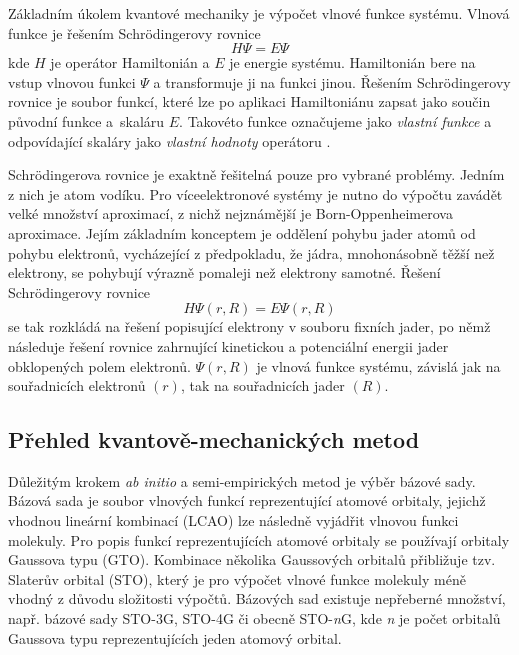 Základním úkolem kvantové mechaniky je výpočet vlnové funkce systému.
Vlnová funkce je řešením Schrödingerovy rovnice $$ H\Psi = E\Psi$$ kde $H$ je operátor Hamiltonián a $E$
 je energie systému. Hamiltonián bere na vstup vlnovou funkci $\Psi$ a transformuje ji na funkci jinou. Řešením Schrödingerovy rovnice je soubor funkcí, které lze po aplikaci Hamiltoniánu zapsat jako součin původní funkce a~skaláru $E$. Takovéto funkce označujeme jako \textit{vlastní funkce} a odpovídající skaláry jako \textit{vlastní hodnoty} operátoru \cite{Volatron}. 
 
 Schrödingerova rovnice je exaktně řešitelná pouze pro vybrané problémy. Jedním z nich je atom vodíku. Pro víceelektronové systémy je nutno do výpočtu zavádět velké množství aproximací, z nichž nejznámější je Born-Oppenheimerova aproximace. %
 Jejím základním konceptem je oddělení pohybu jader atomů od pohybu elektronů, vycházející z předpokladu, že jádra, mnohonásobně těžší než elektrony,
 se pohybují výrazně pomaleji než elektrony samotné. Řešení Schrödingerovy rovnice $$H\Psi(r, R) = E\Psi(r, R)$$se tak rozkládá na řešení popisující elektrony v souboru fixních jader, po němž následuje řešení rovnice zahrnující kinetickou a potenciální energii jader obklopených polem elektronů. $\Psi(r, R)$ je vlnová funkce systému, závislá jak na souřadnicích elektronů $(r)$, tak na souřadnicích jader $(R)$.
 
\subsection{Přehled kvantově-mechanických metod}
Důležitým krokem \textit{ab initio} a semi-empirických metod je výběr bázové sady. Bázová sada je soubor vlnových funkcí reprezentující atomové orbitaly, jejichž vhodnou lineární kombinací (LCAO) lze následně vyjádřit vlnovou funkci molekuly. %
Pro popis funkcí reprezentujících atomové orbitaly se používají orbitaly Gaussova typu (GTO). Kombinace několika Gaussových orbitalů přibližuje tzv. Slaterův orbital (STO), který je pro výpočet vlnové funkce molekuly méně vhodný z důvodu složitosti výpočtů. Bázových sad existuje nepřeberné množství, např. bázové sady STO-3G, STO-4G či obecně STO-\textit{n}G, kde \textit{n} je počet orbitalů Gaussova typu reprezentujících jeden atomový orbital.

